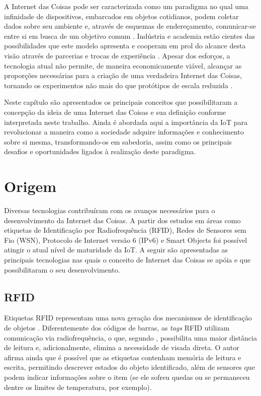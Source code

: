 \documentclass[twoside,english,brazilian]{UNISINOSmonografia}
\begin{document}
A Internet das Coisas pode ser caracterizada como um paradigma no qual uma 
infinidade de dispositivos, embarcados em objetos cotidianos, podem coletar 
dados sobre seu ambiente e, através de esquemas de endereçamento, comunicar-se 
entre si em busca de um objetivo comum \cite{Atzori2010b}.
Indústria e academia estão cientes das possibilidades que este modelo 
apresenta e cooperam em prol do alcance desta visão através de parcerias e 
trocas de experiência  \cite{ITU2005}.
Apesar dos esforços, a tecnologia atual não permite, de maneira economicamente 
viável, alcançar as proporções necessárias para a criação de uma verdadeira 
Internet das Coisas, tornando os experimentos não mais do que protótipos de 
escala reduzida \cite{Smith2012}.


Neste capítulo são apresentados os principais conceitos que possibilitaram a 
concepção da ideia de uma Internet das Coisas e sua definição conforme 
interpretada neste trabalho.
Ainda é abordada aqui a importância da IoT para revolucionar a maneira como a 
sociedade adquire informações e conhecimento sobre si mesma, transformando-os 
em sabedoria, assim como os principais desafios e oportunidades ligados à 
realização deste paradigma.


\section{Origem}

	Diversas tecnologias contribuíram com os avanços necessários para o 
	desenvolvimento da Internet das Coisas. A partir dos estudos em áreas como 
	etiquetas de Identificação por Radiofrequência (RFID), Redes de 
	Sensores sem Fio (WSN), Protocolo de Internet versão 6 (IPv6) e Smart 
	Objects foi possível atingir o atual nível de maturidade da IoT.
	A seguir são apresentadas as principais tecnologias nas quais o conceito de 
	Internet das Coisas se apóia e que possibilitaram o seu desenvolvimento.



\subsection{RFID}
	Etiquetas RFID representam uma nova geração dos mecanismos de 
	identificação de objetos \cite{Brock2001}. Diferentemente dos códigos de 
	barras, as \textit{tags} RFID utilizam comunicação via radiofrequência, o 
	que, segundo , possibilita uma maior distância de 
	leitura e, adicionalmente, elimina a necessidade de visada direta. O autor 
	afirma ainda que é possível que as etiquetas contenham memória de leitura 
	e escrita, permitindo descrever estados do objeto identificado, além de 
	sensores que podem indicar informações sobre o item (se ele sofreu quedas 
	ou se permaneceu dentre os limites de temperatura, por exemplo).
	
\end{document}
